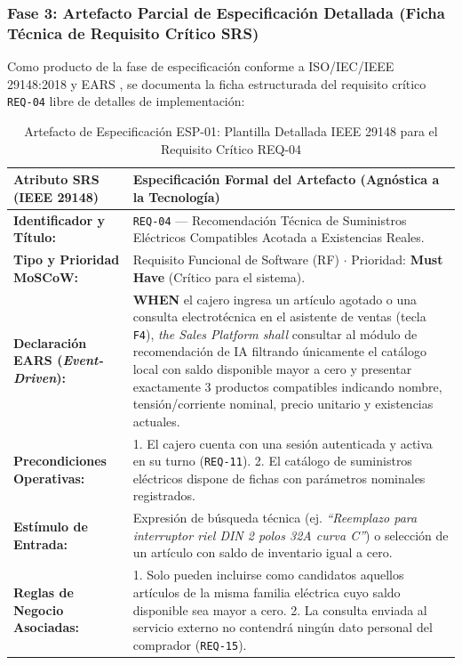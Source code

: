 \documentclass[conference,10pt]{IEEEtran}
\begin{document}
	\subsubsection{Fase 3: Artefacto Parcial de Especificación Detallada (Ficha Técnica de Requisito Crítico SRS)}
	Como producto de la fase de especificación conforme a ISO/IEC/IEEE 29148:2018 \cite{ieee29148} y EARS \cite{mavin2009ears}, se documenta la ficha estructurada del requisito crítico \texttt{REQ-04} libre de detalles de implementación:
	\begin{table}[htbp]
		\centering
		\scriptsize
		\caption{Artefacto de Especificación ESP-01: Plantilla Detallada IEEE 29148 para el Requisito Crítico REQ-04}
		\label{tab:artefacto_especificacion}
		\begin{tabularx}{\textwidth}{>{\raggedright\arraybackslash}p{} Y}
			\toprule
			\textbf{Atributo SRS (IEEE 29148)} & \textbf{Especificación Formal del Artefacto (Agnóstica a la Tecnología)} \\
			\midrule
			\textbf{Identificador y Título:} & \texttt{REQ-04} --- Recomendación Técnica de Suministros Eléctricos Compatibles Acotada a Existencias Reales. \\
			\textbf{Tipo y Prioridad MoSCoW:} & Requisito Funcional de Software (RF) $\cdot$ Prioridad: \textbf{Must Have} (Crítico para el sistema). \\
			\textbf{Declaración EARS (\textit{Event-Driven}):} & \textbf{WHEN} el cajero ingresa un artículo agotado o una consulta electrotécnica en el asistente de ventas (tecla \texttt{F4}), \textit{the Sales Platform shall} consultar al módulo de recomendación de IA filtrando únicamente el catálogo local con saldo disponible mayor a cero y presentar exactamente 3 productos compatibles indicando nombre, tensión/corriente nominal, precio unitario y existencias actuales. \\
			\textbf{Precondiciones Operativas:} & 1. El cajero cuenta con una sesión autenticada y activa en su turno (\texttt{REQ-11}). 2. El catálogo de suministros eléctricos dispone de fichas con parámetros nominales registrados. \\
			\textbf{Estímulo de Entrada:} & Expresión de búsqueda técnica (ej. \textit{``Reemplazo para interruptor riel DIN 2 polos 32A curva C''}) o selección de un artículo con saldo de inventario igual a cero. \\
			\textbf{Reglas de Negocio Asociadas:} & 1. Solo pueden incluirse como candidatos aquellos artículos de la misma familia eléctrica cuyo saldo disponible sea mayor a cero. 2. La consulta enviada al servicio externo no contendrá ningún dato personal del comprador (\texttt{REQ-15}). \\

\end{tabularx}
\end{table}
\end{document}
